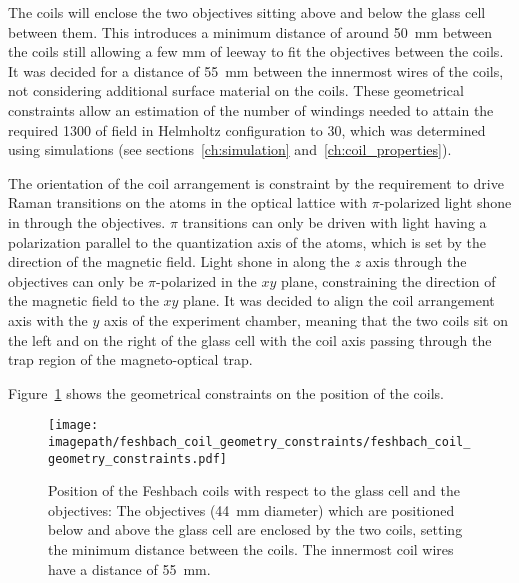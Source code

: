 The coils will enclose the two objectives sitting above and below the glass cell between them. This introduces a minimum distance of around \SI{50}{\milli\meter} between the coils still allowing a few \si[]{\milli\meter} of leeway to fit the objectives between the coils. It was decided for a distance of \SI{55}{\milli\meter} between the innermost wires of the coils, not considering additional surface material on the coils. These geometrical constraints allow an estimation of the number of windings needed to attain the required \SI{1300}{\gauss} of field in Helmholtz configuration to 30, which was determined using simulations (see sections~\ref{ch:simulation} and~\ref{ch:coil_properties}).

The orientation of the coil arrangement is constraint by the requirement to drive Raman transitions on the atoms in the optical lattice with $\pi$-polarized light shone in through the objectives. $\pi$ transitions can only be driven with light having a polarization parallel to the quantization axis of the atoms, which is set by the direction of the magnetic field. Light shone in along the $z$ axis through the objectives can only be $\pi$-polarized in the $xy$ plane, constraining the direction of the magnetic field to the $xy$ plane. It was decided to align the coil arrangement axis with the $y$ axis of the experiment chamber, meaning that the two coils sit on the left and on the right of the glass cell with the coil axis passing through the trap region of the magneto-optical trap.

Figure~\ref{fig:feshbach_coil_geometry_constraints} shows the geometrical constraints on the position of the coils.

\begin{figure}
    \centering
    \texttt{[image: \\imagepath/feshbach\_coil\_geometry\_constraints/feshbach\_coil\_geometry\_constraints.pdf]}
    \caption{Position of the Feshbach coils with respect to the glass cell and the objectives: The objectives (\SI{44}{\milli\meter} diameter) which are positioned below and above the glass cell are enclosed by the two coils, setting the minimum distance between the coils. The innermost coil wires have a distance of \SI{55}{\milli\meter}.}
    \label{fig:feshbach_coil_geometry_constraints}
\end{figure}

